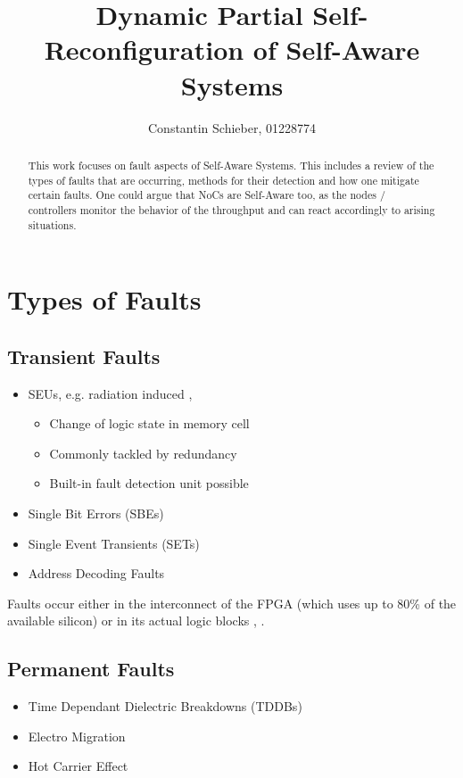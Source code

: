 \documentclass[10pt, journal]{IEEEtran}
\title{Dynamic Partial Self-Reconfiguration of Self-Aware Systems}
\author{Constantin Schieber, 01228774}
\begin{document}
\maketitle

\begin{abstract}
    This work focuses on fault aspects of Self-Aware Systems.
    This includes a review of the types of faults that are occurring, methods for their detection and how one mitigate certain faults. 
    One could argue that \glspl{NoC} are Self-Aware too, as the nodes / controllers monitor the behavior of the throughput and can react accordingly to arising situations.
\end{abstract}

\section{Types of Faults}
\subsection{Transient Faults}
\begin{itemize}
    \item \glspl{SEU}, e.g. radiation induced \cite{alkady_fault-tolerant_2014}, \cite{lee_fault-tolerant_2017}
    \begin{itemize}
    \item Change of logic state in memory cell
    \item Commonly tackled by redundancy
    \item Built-in fault detection unit possible
    \end{itemize}
    \item Single Bit Errors (SBEs)
    \item Single Event Transients (SETs)
    \item Address Decoding Faults
\end{itemize}

Faults occur either in the interconnect of the \gls{FPGA} (which uses up to 80\% of the available silicon) or in its actual logic blocks \cite{alkady_fault-tolerant_2014}, \cite{jing_huang_routability_2004}.
\subsection{Permanent Faults}
\begin{itemize}
    \item Time Dependant Dielectric Breakdowns (TDDBs)
    \item Electro Migration
    \item Hot Carrier Effect
\end{itemize}
\end{document}
